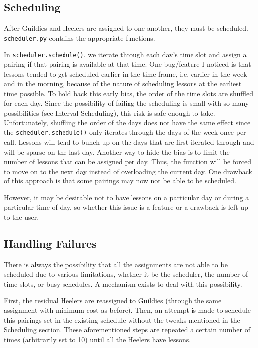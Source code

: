 \documentclass[letterpaper]{article}
\begin{document}
\subsection{Scheduling}
After Guildies and Heelers are assigned to one another, they must be scheduled. \texttt{scheduler.py} contains the
appropriate functions.

In \texttt{scheduler.schedule()}, we iterate through each day's time slot and assign a pairing if that pairing is
available at that time. One bug/feature I noticed is that lessons tended to get scheduled earlier in the time frame,
i.e. earlier in the week and in the morning, because of the nature of scheduling lessons at the earliest time possible.
To hold back this early bias, the order of the time slots are shuffled for each day. Since the possibility of failing the scheduling is
small with so many possibilities (see Interval Scheduling), this risk is safe enough to take. Unfortunately, shuffling
the order of the days does not have the same effect since the \texttt{scheduler.schedule()} only iterates through the
days of the week once per call. Lessons will tend to bunch up on the days that are first iterated through and will be
sparse on the last day. Another way to hide the bias is to limit the number of lessons that can be assigned per day.
Thus, the function will be forced to move on to the next day instead of overloading the current day. One drawback of
this approach is that some pairings may now not be able to be scheduled.

However, it may be desirable not to have lessons on a particular day or during a particular time of day, so whether this
issue is a feature or a drawback is left up to the user.

\subsection{Handling Failures}
There is always the possibility that all the assignments are not able to be scheduled due to various limitations,
whether it be the scheduler, the number of time slots, or busy schedules. A mechanism exists to deal with this
possibility.

First, the residual Heelers are reassigned to Guildies (through the same assignment with minimum cost as before). Then,
an attempt is made to schedule this pairings set in the existing schedule without the tweaks mentioned in the Scheduling
section. These aforementioned steps are repeated a certain number of times (arbitrarily set to 10) until all the Heelers
have lessons.
\end{document}
